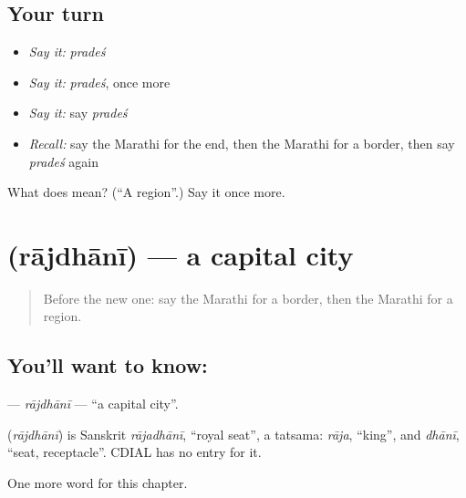 \subsection*{Your turn}
\begin{itemize}
\raggedright
  \item \emph{Say it:} \emph{pradeś}
  \item \emph{Say it:} \emph{pradeś}, once more
  \item \emph{Say it:} say \emph{pradeś}
  \item \emph{Recall:} say the Marathi for the end, then the Marathi for a border, then say \emph{pradeś} again
\end{itemize}

\begin{tcolorbox}[breakable,colback=teal!4,colframe=teal!35!black,title={Before you move on}]
What does  mean? (\textquotedblleft{}A region\textquotedblright{}.) Say it once more.
\end{tcolorbox}
\section[\texorpdfstring{\mr{राजधानी} (rājdhānī)}{राजधानी (rājdhānī)}]{ (rājdhānī) — a capital city}

\label{lesson:MR-C202-rajdhani}



\begin{quote}
Before the new one: say the Marathi for a border, then the Marathi for a region.
\end{quote}

\subsection*{You'll want to know: }
\textbf{} — \emph{rājdhānī} — \textquotedblleft{}a capital city\textquotedblright{}.

\begin{cousinweb}
\textbf{} (\emph{rājdhānī}) is Sanskrit \emph{rājadhānī}, \textquotedblleft{}royal seat\textquotedblright{}, a tatsama: \emph{rāja}, \textquotedblleft{}king\textquotedblright{}, and \emph{dhānī}, \textquotedblleft{}seat, receptacle\textquotedblright{}. CDIAL has no entry for it.
\end{cousinweb}

\begin{grammarlens}[title={What you've built}]
One more word for this chapter.
\end{grammarlens}


